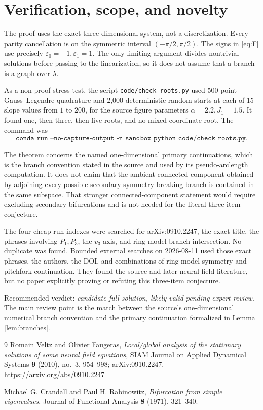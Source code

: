 \documentclass[11pt]{article}
\begin{document}
\section{Verification, scope, and novelty}

The proof uses the exact three-dimensional system, not a discretization.
Every parity cancellation is on the symmetric interval
\((-\pi/2,\pi/2)\).  The signs in \eqref{eq:F} use precisely
\(\varepsilon_0=-1,\varepsilon_1=1\).  The only limiting argument divides
nontrivial solutions before passing to the linearization, so it does not
assume that a branch is a graph over \(\lambda\).

As a non-proof stress test, the script
\texttt{code/check\_roots.py} used 500-point Gauss--Legendre quadrature and
2,000 deterministic random starts at each of 15 slope values from \(1\) to
\(200\), for the source figure parameters \(\alpha=2.2,J_1=1.5\).  It found
one, then three, then five roots, and no mixed-coordinate root.  The command
was
\[
\texttt{conda run --no-capture-output -n sandbox python code/check\_roots.py}.
\]

The theorem concerns the named one-dimensional primary continuations, which
is the branch convention stated in the source and used by its
pseudo-arclength computation.  It does not claim that the ambient connected
component obtained by adjoining every possible secondary symmetry-breaking
branch is contained in the same subspace.  That stronger connected-component
statement would require excluding secondary bifurcations and is not needed
for the literal three-item conjecture.

The four cheap run indexes were searched for arXiv:0910.2247, the exact title,
the phrases involving \(P_1,P_3\), the \(v_3\)-axis, and ring-model branch
intersection.  No duplicate was found.  Bounded external searches on
2026-08-11 used those exact phrases, the authors, the DOI, and combinations
of ring-model symmetry and pitchfork continuation.  They found the source and
later neural-field literature, but no paper explicitly proving or refuting
this three-item conjecture.

Recommended verdict: \emph{candidate full solution, likely valid pending
expert review}.  The main review point is the match between the source's
one-dimensional numerical branch convention and the primary continuation
formalized in Lemma \ref{lem:branches}.

\begin{thebibliography}{9}
Romain Veltz and Olivier Faugeras,
\emph{Local/global analysis of the stationary solutions of some neural field
equations},
SIAM Journal on Applied Dynamical Systems \textbf{9} (2010), no.~3,
954--998; arXiv:0910.2247.
\url{https://arxiv.org/abs/0910.2247}

Michael G. Crandall and Paul H. Rabinowitz,
\emph{Bifurcation from simple eigenvalues},
Journal of Functional Analysis \textbf{8} (1971), 321--340.
\end{thebibliography}
\end{document}
